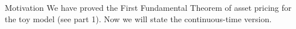 \documentclass[pdf, handout]{beamer}
\begin{document}
\begin{frame}{Motivation}
We have proved the First Fundamental Theorem of asset pricing for the toy model (see part 1). Now we will  state the continuous-time version.
\end{frame}


\end{document}

